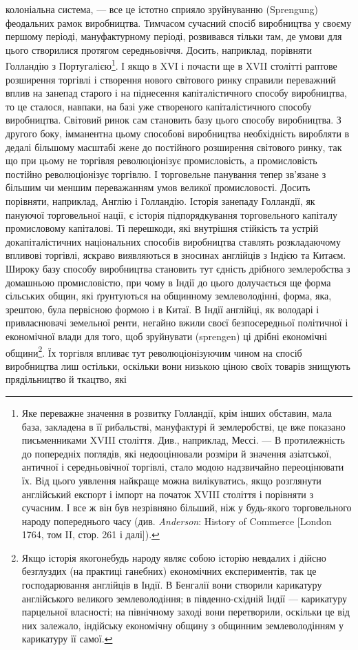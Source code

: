 \parcont{}  %
колоніальна система, — все це істотно сприяло зруйнуванню
(Sprengung) феодальних рамок виробництва. Тимчасом сучасний
спосіб виробництва у своєму першому періоді, мануфактурному
періоді, розвивався тільки там, де умови для цього створилися
протягом середньовіччя. Досить, наприклад, порівняти Голландію
з Португалією\footnote{
Яке переважне значення в розвитку Голландії, крім інших обставин,
мала база, закладена в її рибальстві, мануфактурі й землеробстві, це вже показано
письменниками XVIII століття. Див., наприклад, Мессі. — В протилежність
до попередніх поглядів, які недооцінювали розміри й значення азіатської, античної
і середньовічної торгівлі, стало модою надзвичайно переоцінювати їх.
Від цього уявлення найкраще можна вилікуватись, якщо розглянути англійський
експорт і імпорт на початок XVIII століття і порівняти з сучасним. І все ж
він був незрівняно більший, ніж у будь-якого торговельного народу попереднього
часу (див. \emph{Anderson}: History of Commerce [London 1764, том II, стор. 261
і далі]).
}. І якщо в XVI і почасти ще в XVII столітті
раптове розширення торгівлі і створення нового світового ринку
справили переважний вплив на занепад старого і на піднесення
капіталістичного способу виробництва, то це сталося, навпаки,
на базі уже створеного капіталістичного способу виробництва.
Світовий ринок сам становить базу цього способу виробництва.
З другого боку, імманентна цьому способові виробництва необхідність
виробляти в дедалі більшому масштабі жене до постійного
розширення світового ринку, так що при цьому не торгівля
революціонізує промисловість, а промисловість постійно революціонізує
торгівлю. І торговельне панування тепер зв’язане
з більшим чи меншим переважанням умов великої промисловості.
Досить порівняти, наприклад, Англію і Голландію. Історія занепаду
Голландії, як пануючої торговельної нації, є історія підпорядкування
торговельного капіталу промисловому капіталові.
Ті перешкоди, які внутрішня стійкість та устрій докапіталістичних
національних способів виробництва ставлять розкладаючому
впливові торгівлі, яскраво виявляються в зносинах англійців
з Індією та Китаєм. Широку базу способу виробництва
становить тут єдність дрібного землеробства з домашньою промисловістю,
при чому в Індії до цього долучається ще форма
сільських общин, які ґрунтуються на общинному землеволодінні,
форма, яка, зрештою, була первісною формою і в Китаї.
В Індії англійці, як володарі і привласнювачі земельної ренти,
негайно вжили своєї безпосередньої політичної і економічної
влади для того, щоб зруйнувати (sprengen) ці дрібні економічні
общини\footnote{
Якщо історія якогонебудь народу являє собою історію невдалих і дійсно
безглуздих (на практиці ганебних) економічних експериментів, так це господарювання
англійців в Індії. В Бенгалії вони створили карикатуру англійського
великого землеволодіння; в південно-східній Індії — карикатуру парцельної
власності; на північному заході вони перетворили, оскільки це від них залежало,
індійську економічну общину з общинним землеволодінням у карикатуру її
самої.
}. Їх торгівля впливає тут революціонізуючим чином
на спосіб виробництва лиш остільки, оскільки вони низькою
ціною своїх товарів знищують прядільництво й ткацтво, які
\parbreak{}  %
